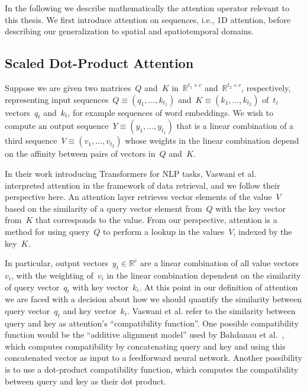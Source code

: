 In the following we describe mathematically the attention operator relevant to
this thesis.
We first introduce attention on sequences, i.e., 1D attention, before
describing our generalization to spatial and spatiotemporal domains.


\subsection{Scaled Dot-Product Attention}

Suppose we are given two matrices~$Q$ and~$K$ in~$\mathbb{R}^{t_1 \times c}$
and~$\mathbb{R}^{t_2\times c}$, respectively, representing input
sequences~$Q \equiv (q_1, \dots, k_{t_1})$ and~$K \equiv (k_1, \dots, k_{t_2})$
of~$t_i$ vectors~$q_t$ and~$k_t$, for example sequences of word embeddings.
We wish to compute an output sequence~$Y \equiv (y_1, \dots, y_{t_1})$ that is
a linear combination of a third sequence~$V \equiv (v_1, \dots, v_{t_2})$ whose
weights in the linear combination depend on the affinity between pairs of
vectors in~$Q$ and~$K$.

In their work introducing Transformers for NLP tasks, Vaswani et
al.~\cite{vaswani2017attention} interpreted attention in the framework of data
retrieval, and we follow their perspective here.
An attention layer retrieves vector elements of the value~$V$ based on the
similarity of a query vector element from~$Q$ with the key vector from~$K$ that
corresponds to the value.
From our perspective, attention is a method for using query~$Q$ to perform a
lookup in the values~$V$, indexed by the key~$K$.

In particular, output vectors~$y_t \in \mathbb{R}^c$ are a linear combination
of all value vectors~$v_i$, with the weighting of~$v_i$ in the linear
combination dependent on the similarity of query vector~$q_t$ with key
vector~$k_i$.
At this point in our definition of attention we are faced with a decision about
how we should quantify the similarity between query vector~$q_t$ and key
vector~$k_i$.
Vaswani et al. refer to the similarity between query and key as attention's
``compatibility function''.
One possible compatibility function would be the ``additive alignment model''
used by Bahdanau et al.~\cite{bahdanau2015neuralmt}, which computes
compatibility by concatenating query and key and using this concatenated vector
as input to a feedforward neural network.
Another possibility is to use a dot-product compatibility function, which
computes the compatibility between query and key as their dot product.

